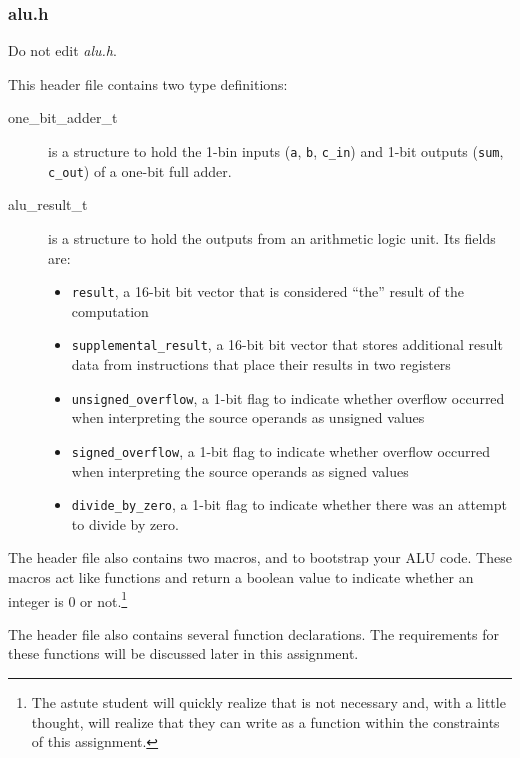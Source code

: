 \subsubsection{alu.h} \label{subsubsec:alu.h}

Do not edit \textit{alu.h}.

This header file contains two type definitions:
\begin{description}
    \item[one\_bit\_adder\_t] is a structure to hold the 1-bin inputs (\lstinline{a}, \lstinline{b}, \lstinline{c_in}) and 1-bit outputs (\lstinline{sum}, \lstinline{c_out}) of a one-bit full adder.
    \item[alu\_result\_t] is a structure to hold the outputs from an arithmetic logic unit.
        Its fields are:
        \begin{itemize}
            \item \lstinline{result}, a 16-bit bit vector that is considered ``the'' result of the computation
            \item \lstinline{supplemental_result}, a 16-bit bit vector that stores additional result data from instructions that place their results in two registers
            \item \lstinline{unsigned_overflow}, a 1-bit flag to indicate whether overflow occurred when interpreting the source operands as unsigned values
            \item \lstinline{signed_overflow}, a 1-bit flag to indicate whether overflow occurred when interpreting the source operands as signed values
            \item \lstinline{divide_by_zero}, a 1-bit flag to indicate whether there was an attempt to divide by zero.
        \end{itemize}
\end{description}

The header file also contains two macros,  and  to bootstrap your ALU code.
These macros act like functions and return a boolean value to indicate whether an integer is 0 or not.\footnote{
    The astute student will quickly realize that  is not necessary and, with a little thought, will realize that they can write  as a function within the constraints of this assignment.}

The header file also contains several function declarations.
The requirements for these functions will be discussed later in this assignment.

